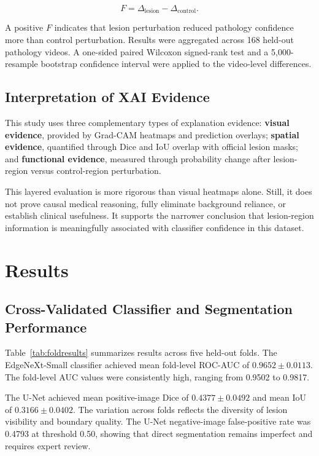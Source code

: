 \begin{equation}
F=
\Delta_{\text{lesion}}
-
\Delta_{\text{control}}.
\end{equation}

A positive $F$ indicates that lesion perturbation reduced pathology confidence more than control perturbation. Results were aggregated across 168 held-out pathology videos. A one-sided paired Wilcoxon signed-rank test \cite{wilcoxon1945} and a 5,000-resample bootstrap confidence interval were applied to the video-level differences.

\subsection{Interpretation of XAI Evidence}

This study uses three complementary types of explanation evidence: \textbf{visual evidence}, provided by Grad-CAM heatmaps and prediction overlays; \textbf{spatial evidence}, quantified through Dice and IoU overlap with official lesion masks; and \textbf{functional evidence}, measured through probability change after lesion-region versus control-region perturbation.

This layered evaluation is more rigorous than visual heatmaps alone. Still, it does not prove causal medical reasoning, fully eliminate background reliance, or establish clinical usefulness. It supports the narrower conclusion that lesion-region information is meaningfully associated with classifier confidence in this dataset.

\section{Results}

\subsection{Cross-Validated Classifier and Segmentation Performance}

Table~\ref{tab:foldresults} summarizes results across five held-out folds. The EdgeNeXt-Small classifier achieved mean fold-level ROC-AUC of $0.9652\pm0.0113$. The fold-level AUC values were consistently high, ranging from 0.9502 to 0.9817.

The U-Net achieved mean positive-image Dice of $0.4377\pm0.0492$ and mean IoU of $0.3166\pm0.0402$. The variation across folds reflects the diversity of lesion visibility and boundary quality. The U-Net negative-image false-positive rate was 0.4793 at threshold 0.50, showing that direct segmentation remains imperfect and requires expert review.

